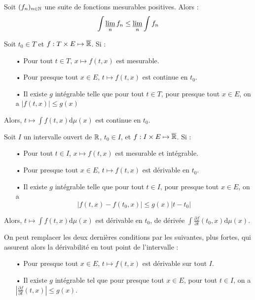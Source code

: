 \documentclass[11pt,a4paper]{article}
\begin{document}
\begin{lemmastar}[Fatou]
Soit $(f_n)_{n\in\mathbb N}$ une suite de fonctions mesurables positives. Alors :
\[\int \varliminf_n f_n \leq \varliminf_n \int f_n\]
\end{lemmastar}


\begin{propstar}
Soit $t_0 \in T$  et $f : T \times E \mapsto \overline{\mathbb R} $. Si :
\begin{itemize}
\item[•] Pour tout $t\in T$, $x\mapsto f(t,x)$ est mesurable.
\item[•] Pour presque tout $x \in E$, $t\mapsto f(t,x)$ est continue en $t_0$.
\item[•] Il existe $g$ intégrable telle que pour tout $t\in T$, pour presque tout $x \in E$, on a $\left| f(t,x) \right| \leq g(x)$
\end{itemize}
Alors, $t\mapsto \displaystyle \int f(t,x)\mathrm{d}\mu(x)$ est continue en $t_0$.
\end{propstar}


\begin{propstar}
Soit $I$ un intervalle ouvert de $\mathbb R$, $t_0 \in I$, et $f:I \times E \mapsto \overline{\mathbb R}$. Si :
\begin{itemize}
\item[•] Pour tout $t\in I$, $x\mapsto f(t,x)$ est mesurable et intégrable.
\item[•] Pour presque tout $x \in E$, $t\mapsto f(t,x)$ est dérivable en $t_0$.
\item[•] Il existe $g$ intégrable telle que pour tout $t\in I$, pour presque tout $x \in E$, on a \[\left| f(t,x) - f(t_0,x) \right| \leq g(x) \left|t-t_0\right|\]
\end{itemize}
Alors, $t\mapsto \displaystyle \int f(t,x)\mathrm{d}\mu(x)$ est dérivable en $t_0$, de dérivée $\displaystyle \int \frac{\partial f}{\partial t} (t_0,x)\mathrm{d}\mu(x)$.
\end{propstar}


\begin{rmq}
On peut remplacer les deux dernières conditions par les suivantes, plus fortes, qui assurent alors la dérivabilité en tout point de l'intervalle :
\begin{itemize}
\item[•] Pour presque tout $x \in E$, $t\mapsto f(t,x)$ est dérivable sur tout $I$.
\item[•] Il existe $g$ intégrable tel que pour presque tout $x\in E$, pour tout $t\in I$, on a $\displaystyle \left| \frac{\partial f}{\partial t}(t,x) \right| \leq g(x)$.
\end{itemize}
\end{rmq}
\end{document}
